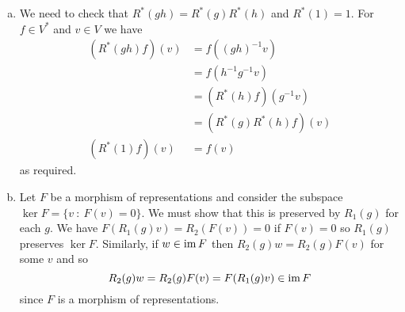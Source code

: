 \documentclass[12pt]{article}
\begin{document}
\iffalse
\begin{answer}
\begin{enumerate}[(a)]
\item We need to check that $R^*(gh)=R^*(g)R^*(h)$ and $R^*(1)=1$. For $f\in V^*$ and $v\in V$ we have
\begin{align*}
(R^*(gh)f)(v)&=f((gh)^{-1}v)\\
             &=f(h^{-1}g^{-1}v)\\
             &=(R^*(h)f)(g^{-1}v)\\
             &=(R^*(g)R^*(h)f)(v)\\
(R^*(1)f)(v) &=f(v)
\end{align*}
as required.
\item Let $F$ be a morphism of representations and consider the subspace $\ker F=\{v\ :\ F(v)=0\}$. We must show that this is preserved by $R_1(g)$ for each $g$. We have $F(R_1(g)v)=R_2(F(v))=0$ if $F(v)=0$ so $R_1(g)$ preserves $\ker F$. Similarly, if $w\in\operatorname{im} F$ then $R_2(g)w=R_2(g)F(v)$ for some $v$ and so
\[R_2(g)w=R_2(g)F(v)=F(R_1(g)v)\in\operatorname{im} F\]
since $F$ is a morphism of representations.


\end{enumerate}
\end{answer}
\end{document}
